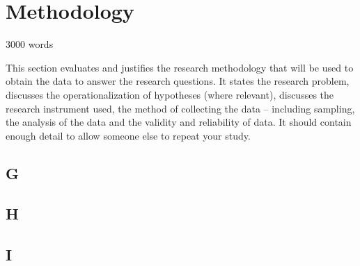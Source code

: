 \chapter{Methodology}\label{ch:methodology}

3000 words

This section evaluates and justifies the research methodology that will be used to obtain the data to answer the research questions.
It states the research problem, discusses the operationalization of hypotheses (where relevant), discusses the research instrument used, the method of collecting the data – including sampling, the analysis of the data and the validity and reliability of data.
It should contain enough detail to allow someone else to repeat your study.

\section{G}\label{sec:G}
\lipsum[1]

\section{H}\label{sec:H}
\lipsum[1]

\section{I}\label{sec:I}
\lipsum[1]